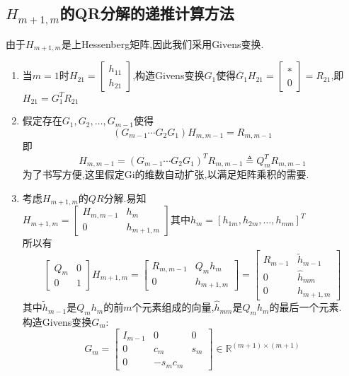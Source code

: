 \documentclass[12pt,a4paper]{article}
\begin{document}
\subsection*{$H_{m+1, m}$的QR分解的递推计算方法}
由于$H_{m+1, m}$是上Hessenberg矩阵,因此我们采用Givens变换.\\
\begin{enumerate}[(1)]
\item 当$m=1$时$H_{21}=\left[\begin{array}{l}{h_{11}} \\ {h_{21}}\end{array}\right]$,构造Givens变换$G_1$使得$\overline{G}_{1} H_{21}=\left[\begin{array}{l}{*} \\ {0}\end{array}\right]=R_{21}$,即$H_{21}=G_{1}^{T} R_{21}$
\item 假定存在$G_{1}, G_{2}, \ldots, G_{m-1}$使得
$$
\left(G_{m-1} \cdots G_{2} G_{1}\right) H_{m, m-1}=R_{m, m-1}
$$
即
$$
H_{m, m-1}=\left(G_{m-1} \cdots G_{2} G_{1}\right)^{T} R_{m, m-1} \triangleq Q_{m}^{T} R_{m, m-1}
$$
为了书写方便,这里假定Gi的维数自动扩张,以满足矩阵乘积的需要.
\item 考虑$H_{m+1, m}$的$QR$分解.易知\\
$
H_{m+1, m}=\left[\begin{array}{cc}{H_{m, m-1}} & {h_{m}} \\ {0} & {h_{m+1, m}}\end{array}\right]
$其中$h_{m}=\left[h_{1 m}, h_{2 m}, \ldots, h_{m m}\right]^{T}$\\
所以有
$$
\left[\begin{array}{cc}{Q_{m}} & {0} \\ {0} & {1}\end{array}\right] H_{m+1, m}=\left[\begin{array}{cc}{R_{m, m-1}} & {Q_{m} h_{m}} \\ {0} & {h_{m+1, m}}\end{array}\right]=\left[\begin{array}{cc}{R_{m-1}} & {\tilde{h}_{m-1}} \\ {0} & {\hat{h}_{m m}} \\ {0} & {h_{m+1, m}}\end{array}\right]
$$
其中$\tilde{h}_{m-1}$是$Q_{m} h_{m}$的前$m$个元素组成的向量,$\hat{h}_{m m}$是$Q_{m} h_{m}$的最后一个元素.\\
构造Givens变换$G_{m}$:
$$
G_{m}=\left[\begin{array}{ccc}{I_{m-1}} & {0} & {0} \\ {0} & {c_{m}} & {s_{m}} \\ {0} & {-s_{m} c_{m}}\end{array}\right] \in \mathbb{R}^{(m+1) \times(m+1)}
$$
\end{enumerate}
\end{document}
